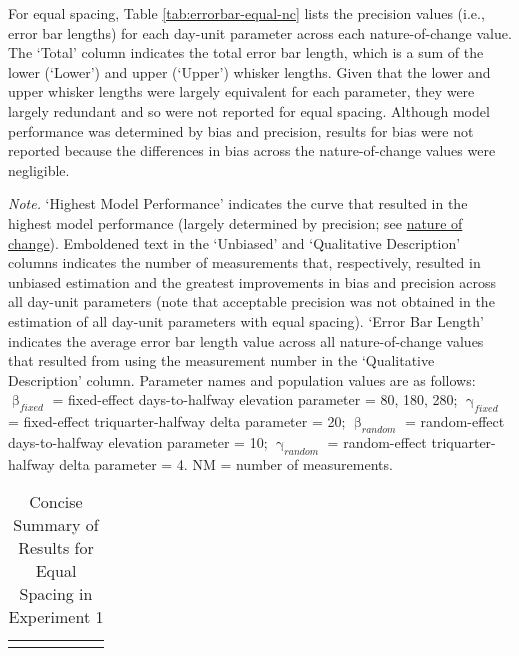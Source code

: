 \documentclass[
12pt, %
twoside,
english]{guelphthesis}
\begin{document}
For equal spacing, Table \ref{tab:errorbar-equal-nc} lists the precision values (i.e., error bar lengths) for each day-unit parameter across each nature-of-change value. The `Total' column indicates the total error bar length, which is a sum of the lower (`Lower') and upper (`Upper') whisker lengths. Given that the lower and upper whisker lengths were largely equivalent for each parameter, they were largely redundant and so were not reported for equal spacing. Although model performance was determined by bias and precision, results for bias were not reported because the differences in bias across the nature-of-change values were negligible.

\begin{landscape}
\begin{ThreePartTable}
\begin{TableNotes}
\item \textit{Note. }`Highest Model Performance' indicates the curve that resulted in the highest model performance (largely determined by precision; see \hyperref[nature-change-equal-exp1]{nature of change}). Emboldened text in the `Unbiased' and `Qualitative Description' columns indicates the number of measurements that, respectively, resulted in unbiased estimation and the greatest improvements in bias and precision across all day-unit parameters (note that acceptable precision was not obtained in the estimation of all day-unit parameters with equal spacing). `Error Bar Length' indicates the average error bar length value across all nature-of-change values that resulted from using the measurement number in the `Qualitative Description' column. Parameter names and population values are as follows: $\upbeta_{fixed}$ = fixed-effect days-to-halfway elevation parameter = {80, 180, 280}; $\upgamma_{fixed}$ = fixed-effect triquarter-halfway delta parameter = 20; $\upbeta_{random}$ = random-effect days-to-halfway elevation parameter = 10; $\upgamma_{random}$ = random-effect triquarter-halfway delta parameter = 4. NM = number of measurements.
\end{TableNotes}
\begin{longtable}[l]{>{\raggedright\arraybackslash}p{2cm}>{\centering\arraybackslash}p{5cm}>{\centering\arraybackslash}p{2.5cm}>{\centering\arraybackslash}p{3cm}>{\raggedright\arraybackslash}p{6.5cm}>{\centering\arraybackslash}p{3cm}}
\caption{\label{tab:summary-table-equal-spacing-exp1}Concise Summary of Results for Equal Spacing in Experiment 1}\\
\toprule
\multicolumn{4}{c}{ } & \multicolumn{2}{c}{Summary} \\

\end{longtable}
\end{ThreePartTable}
\end{landscape}
\end{document}
